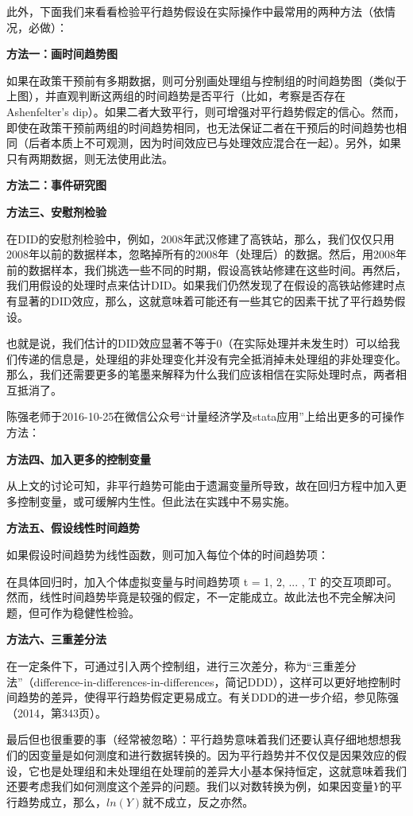 \documentclass[cn,12pt,math=newtx,citestyle=gb7714-2015,bibstyle=gb7714-2015]{elegantbook}
\begin{document}
	此外，下面我们来看看检验平行趋势假设在实际操作中最常用的两种方法（依情况，必做）：
	
	\textbf{方法一：画时间趋势图}
	
	如果在政策干预前有多期数据，则可分别画处理组与控制组的时间趋势图（类似于上图），并直观判断这两组的时间趋势是否平行（比如，考察是否存在Ashenfelter's dip）。如果二者大致平行，则可增强对平行趋势假定的信心。然而，即使在政策干预前两组的时间趋势相同，也无法保证二者在干预后的时间趋势也相同（后者本质上不可观测，因为时间效应已与处理效应混合在一起）。另外，如果只有两期数据，则无法使用此法。
	
	\textbf{方法二：事件研究图}
		
	
	\textbf{方法三、安慰剂检验}
	
	在DID的安慰剂检验中，例如，2008年武汉修建了高铁站，那么，我们仅仅只用2008年以前的数据样本，忽略掉所有的2008年（处理后）的数据。然后，用2008年前的数据样本，我们挑选一些不同的时期，假设高铁站修建在这些时间。再然后，我们用假设的处理时点来估计DID。如果我们仍然发现了在假设的高铁站修建时点有显著的DID效应，那么，这就意味着可能还有一些其它的因素干扰了平行趋势假设。
	
	也就是说，我们估计的DID效应显著不等于0（在实际处理并未发生时）可以给我们传递的信息是，处理组的非处理变化并没有完全抵消掉未处理组的非处理变化。那么，我们还需要更多的笔墨来解释为什么我们应该相信在实际处理时点，两者相互抵消了。
	
	陈强老师于2016-10-25在微信公众号“计量经济学及stata应用”上给出更多的可操作方法：
	
	\textbf{方法四、加入更多的控制变量}
	
	从上文的讨论可知，非平行趋势可能由于遗漏变量所导致，故在回归方程中加入更多控制变量，或可缓解内生性。但此法在实践中不易实施。
	
	\textbf{方法五、假设线性时间趋势}
	
	如果假设时间趋势为线性函数，则可加入每位个体的时间趋势项：
	
	在具体回归时，加入个体虚拟变量与时间趋势项 t = 1, 2, ... , T 的交互项即可。然而，线性时间趋势毕竟是较强的假定，不一定能成立。故此法也不完全解决问题，但可作为稳健性检验。
	
	\textbf{方法六、三重差分法}
	
	在一定条件下，可通过引入两个控制组，进行三次差分，称为“三重差分法”（difference-in-differences-in-differences，简记DDD），这样可以更好地控制时间趋势的差异，使得平行趋势假定更易成立。有关DDD的进一步介绍，参见陈强（2014，第343页）。
	
	最后但也很重要的事（经常被忽略）：平行趋势意味着我们还要认真仔细地想想我们的因变量是如何测度和进行数据转换的。因为平行趋势并不仅仅是因果效应的假设，它也是处理组和未处理组在处理前的差异大小基本保持恒定，这就意味着我们还要考虑我们如何测度这个差异的问题。我们以对数转换为例，如果因变量$Y$的平行趋势成立，那么，$ln(Y)$就不成立，反之亦然。
	
\end{document}
